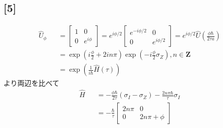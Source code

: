 \documentclass[12pt,dvipdfmx]{jsarticle}
\begin{document}
\subsection*{\large{[5]}}
\begin{eqnarray}
  \hat{U}_{\phi} &&= 
  \begin{bmatrix}
    1 & 0\\
    0 & e^{i\phi}
  \end{bmatrix}
  = e^{i\phi/2}
  \begin{bmatrix}
    e^{-i\phi/2} & 0\\
    0 & e^{i\phi/2}
  \end{bmatrix}
  =e^{i\phi/2} \hat{U}\left( \frac{\phi\hbar}{2\tau a} \right)\\
  && = \exp\left( i \frac{\phi}{2} + 2i n\pi \right) \exp\left( -i \frac{\phi}{2}\sigma_Z \right),n\in \bm{Z}\\
  &&= \exp\left( \frac{1}{i\hbar}\hat{H}(\tau) \right)
\end{eqnarray}
より両辺を比べて
\begin{eqnarray}
  \hat{H} &&= -\frac{\phi\hbar}{2\tau}\left( \sigma_I-\sigma_Z \right)-\frac{2n\pi\hbar}{\tau}\sigma_I \\
  &&=-\frac{\hbar}{\tau}
  \begin{bmatrix}
    2n\pi & 0\\
    0 & 2n\pi+\phi
  \end{bmatrix}
\end{eqnarray}
\end{document}
